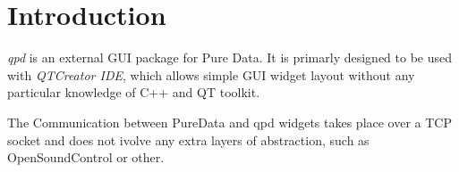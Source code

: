 \documentclass{article}
\begin{document}
\part{Introduction}

{\emph{qpd} is an external GUI package for Pure Data.
It is primarly designed to be used with \emph{QTCreator IDE},
which allows simple GUI widget layout without any particular
knowledge of C++ and QT toolkit.}

{The Communication between PureData and qpd widgets takes place over
a TCP socket and does not ivolve any extra layers of abstraction,
such as OpenSoundControl or other.}
\end{document}
